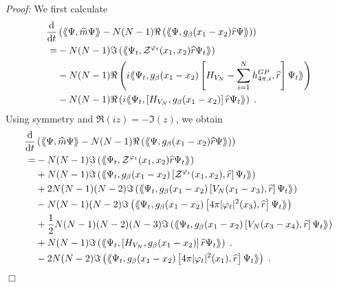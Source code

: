 \documentclass[11pt, english, american]{article}
\newcommand{\laa}{\langle\hspace{-0.08cm}\langle}
\newcommand{\raa}{\rangle\hspace{-0.08cm}\rangle}
\newcommand{\dt}{\frac{\text{d}}{\text{d}t}}
\newenvironment{proof}{\emph{Proof:}}{\begin{flushright} $ \Box $ \end{flushright}}
\renewcommand{\phi}{\varphi}
\begin{document}
\begin{proof}
We first calculate
\begin{align*}
\dt &
\left(
\laa \Psi, \widehat{m} \Psi \raa
%
-N(N-1)\Re\left(\laa\Psi
, g_{\beta}(x_{1}-x_{2}) \widehat{r}
\Psi\raa\right)
\right)
\\
=&
-N(N-1)\Im\left(\laa\Psi_t ,\mathcal{Z}^{\phi_t}(x_1,x_2) \widehat{r}
\Psi_t\raa\right)
\\&-N(N-1)\Re\left(i\laa\Psi_t , g_{\beta}(x_{1}-x_{2})\left[H_{V_N}-\sum_{i=1}^N h^{GP}_{4 \pi,i},
\widehat{r}\right] \Psi_t\raa\right)
%
\\&-N(N-1)\Re\left(i\laa\Psi_t ,\left[H_{V_N},
g_{\beta}(x_{1}-x_{2})
\right]\widehat{r}
\Psi_t\raa\right)
\;.
%
\end{align*}
Using symmetry and $\Re(iz)=-\Im(z)$, we obtain
\begin{align*}
\dt &
\left(
\laa \Psi, \widehat{m} \Psi \raa
%
-N(N-1)\Re\left(\laa\Psi
, g_{\beta}(x_{1}-x_{2}) \widehat{r}
\Psi\raa\right)
\right)
\\
=&
-N(N-1)\Im\left(\laa\Psi_t ,\mathcal{Z}^{\phi_t}(x_1,x_2) \widehat{r}
\Psi_t\raa\right)
\\&+N(N-1)\Im\left(\laa\Psi_t ,g_{\beta}(x_{1}-x_{2})\left[\mathcal{Z}^{\phi_t}(x_1,x_2),
\widehat{r}\right] \Psi_t\raa\right)
%
\\&+2N(N-1)(N-2)\Im\left(\laa\Psi _t,g_{\beta}(x_{1}-x_{2})
\left[V_N(x_1-x_3),
\widehat{r}\right] \Psi_t\raa\right)
%
\\&-N(N-1)(N-2)\Im\left(\laa\Psi_t,g_{\beta}(x_{1}-x_{2})
\left[4 \pi |\phi_t|^2(x_3),
\widehat{r}\right] \Psi_t\raa\right)
%
\\&+\frac{1}{2}N(N-1)(N-2)(N-3)\Im\left(\laa\Psi_t ,
g_{\beta}(x_{1}-x_{2})\left[V_N(x_3-x_4),
\widehat{r}\right] \Psi_t\raa\right)
%
\\&+N(N-1)\Im\left(\laa\Psi_t ,\left[H_{V_N},
g_{\beta}(x_{1}-x_{2})
\right]\widehat{r}
\Psi_t\raa\right)\;.
%
\\
&-
2
N(N-2)\Im\left(\laa\Psi_t,g_{\beta}(x_{1}-x_{2})
\left[4 \pi |\phi_t|^2(x_1),
\widehat{r}\right] \Psi_t\raa\right)
\;.
\end{align*}




\end{proof}
\end{document}

